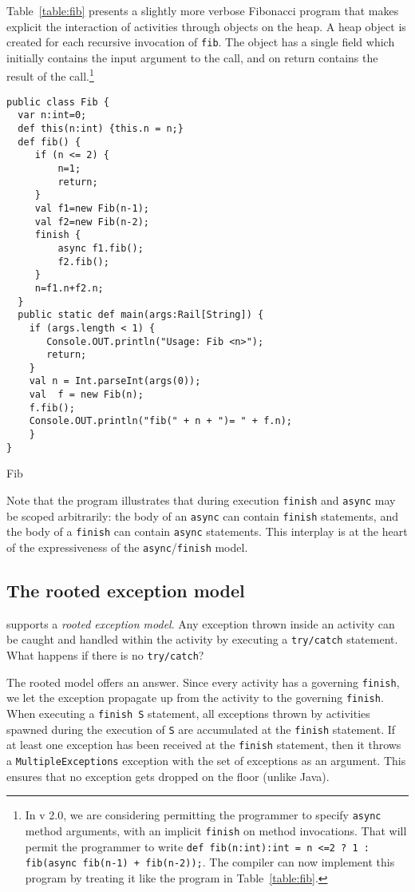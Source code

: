Table~\ref{table:fib} presents a slightly more verbose Fibonacci
program that makes explicit the interaction of activities through
objects on the heap. A heap object is created for each recursive
invocation of {\tt fib}. The object has a single field which initially
contains the input argument to the call, and on return contains the
result of the call.\footnote{In \Xten{} v 2.0, we are considering
permitting the programmer to specify {\tt async} method arguments,
with an implicit {\tt finish} on method invocations. That will permit
the programmer to write {\tt def fib(n:int):int = n <=2 ? 1 :
fib(async {fib(n-1)} + fib(n-2));}. The compiler can now implement
this program by treating it like the program in
Table~\ref{table:fib}.}

\begin{table}
{\footnotesize
\begin{verbatim}
public class Fib {
  var n:int=0;
  def this(n:int) {this.n = n;}
  def fib() {
     if (n <= 2) {
    	 n=1;
    	 return;
     }
     val f1=new Fib(n-1);
     val f2=new Fib(n-2);
     finish {
    	 async f1.fib();
         f2.fib(); 
     }
     n=f1.n+f2.n;
  }
  public static def main(args:Rail[String]) {
    if (args.length < 1) {
       Console.OUT.println("Usage: Fib <n>");
       return;
    }
    val n = Int.parseInt(args(0));
    val  f = new Fib(n);
    f.fib();
    Console.OUT.println("fib(" + n + ")= " + f.n);
    }
}
\end{verbatim}}
\caption{Fib}\label{table:fib}
\end{table}

Note that the program illustrates that during execution {\tt finish}
and {\tt async} may be scoped arbitrarily: the body of an {\tt async}
can contain {\tt finish} statements, and the body of a {\tt finish}
can contain {\tt async} statements. This interplay is at the heart of
the expressiveness of the {\tt async}/{\tt finish} model.

\subsection{The rooted exception model}

\Xten{} supports a {\em rooted exception model}. Any exception thrown
inside an activity can be caught and handled within the activity by
executing a {\tt try/catch} statement. What happens if there is no
{\tt try/catch}? 

The rooted model offers an answer. Since every activity has a
governing {\tt finish}, we let the exception propagate up from the
activity to the governing {\tt finish}.  When executing a {\tt finish
S} statement, all exceptions thrown by activities spawned during the
execution of {\tt S} are accumulated at the {\tt finish} statement. If
at least one exception has been received at the {\tt finish}
statement, then it throws a {\tt MultipleExceptions} exception with
the set of exceptions as an argument. This ensures that no exception
gets dropped on the floor (unlike Java).

